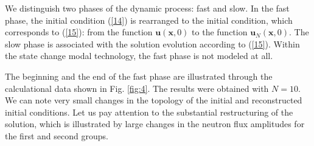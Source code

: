 \documentclass[a4paper]{jpconf}
\begin{document}
We distinguish two phases of the dynamic process: fast and slow. In the fast phase, the initial condition (\ref{14}) 
is rearranged to the initial condition, which corresponds to (\ref{15}): from the function
$\bm u(\bm x, 0)$ to the function $\bm u_N(\bm x, 0)$. The slow phase is associated with the solution evolution according to (\ref{15}).
Within the state change modal technology, the fast phase is not modeled at all.

The beginning and the end of the fast phase are illustrated through the calculational data shown in Fig. \ref{fig:4}. The results were obtained with $N=10$. We can note very small changes in the topology of the initial and reconstructed initial conditions. Let us pay attention to the substantial restructuring of the solution, which is illustrated by large changes in the neutron flux amplitudes for the first and second groups.
\end{document}
